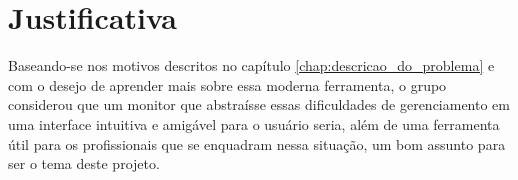 \section{Justificativa}
\label{sec:justificativa}

Baseando-se nos motivos descritos no capítulo \ref{chap:descricao_do_problema} e com o desejo de aprender mais sobre essa moderna ferramenta, o grupo considerou que um monitor \web{} que abstraísse essas dificuldades de gerenciamento em uma interface intuitiva e amigável para o usuário seria, além de uma ferramenta útil para os profissionais que se enquadram nessa situação, um bom assunto para ser o tema deste projeto.